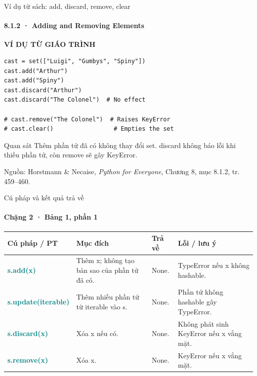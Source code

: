 \documentclass[aspectratio=169,10pt]{beamer}
\begin{document}
\begin{frame}[fragile,t]{Ví dụ từ sách: add, discard, remove, clear}
\framesubtitle{8.1.2 · Adding and Removing Elements}
{\small\color{teal}\textbf{VÍ DỤ TỪ GIÁO TRÌNH}}\par\medskip
\begin{Verbatim}[fontsize=\footnotesize,frame=single,framesep=3mm,rulecolor=\color{teal!35},breaklines=true]
cast = set(["Luigi", "Gumbys", "Spiny"])
cast.add("Arthur")
cast.add("Spiny")
cast.discard("Arthur")
cast.discard("The Colonel")  # No effect

# cast.remove("The Colonel")  # Raises KeyError
# cast.clear()                 # Empties the set
\end{Verbatim}
\begin{block}{Quan sát}
Thêm phần tử đã có không thay đổi set. discard không báo lỗi khi thiếu phần tử, còn remove sẽ gây KeyError.
\end{block}
\vfill
{\scriptsize\color{muted}Nguồn: Horstmann \& Necaise, \textit{Python for Everyone}, Chương 8, mục 8.1.2, tr. 459–460.}
\end{frame}


\begin{frame}[t]{Cú pháp và kết quả trả về}
\framesubtitle{Chặng 2 · Bảng 1, phần 1}
\begingroup\scriptsize
\renewcommand{\arraystretch}{1.35}
\begin{tabularx}{\linewidth}{>{\raggedright\arraybackslash}p{2.42cm} >{\raggedright\arraybackslash}X >{\raggedright\arraybackslash}p{2.3cm} >{\raggedright\arraybackslash}p{3.15cm}}
\toprule
\textbf{Cú pháp / PT} & \textbf{Mục đích} & \textbf{Trả về} & \textbf{Lỗi / lưu ý} \\
\midrule
\textcolor{teal}{\bfseries s.add(x)} & Thêm x; không tạo bản sao của phần tử đã có. & None. & TypeError nếu x không hashable. \\
\midrule
\textcolor{teal}{\bfseries s.update(iterable)} & Thêm nhiều phần tử từ iterable vào s. & None. & Phần tử không hashable gây TypeError. \\
\midrule
\textcolor{teal}{\bfseries s.discard(x)} & Xóa x nếu có. & None. & Không phát sinh KeyError nếu x vắng mặt. \\
\midrule
\textcolor{teal}{\bfseries s.remove(x)} & Xóa x. & None. & KeyError nếu x vắng mặt. \\
\midrule
\bottomrule
\end{tabularx}
\endgroup

\end{frame}
\end{document}
